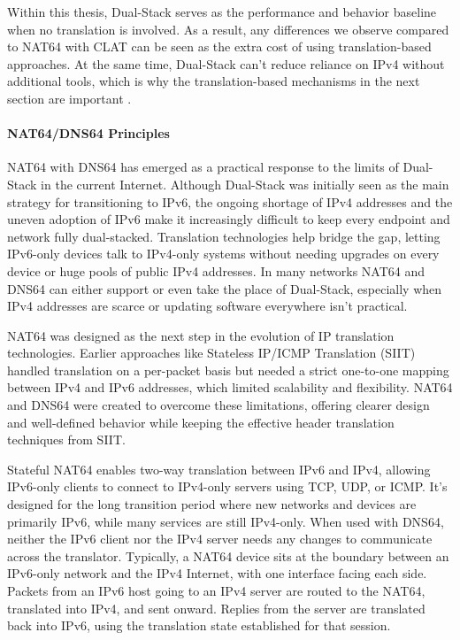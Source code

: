 Within this thesis, Dual-Stack serves as the performance and behavior baseline when no translation is involved. As a result, any differences we observe compared to NAT64 with CLAT can be seen as the extra cost of using translation-based approaches. At the same time, Dual-Stack can’t reduce reliance on IPv4 without additional tools, which is why the translation-based mechanisms in the next section are important \cite{punithavathani2009ipv4,LEVIN20141059}.

\paragraph{NAT64/DNS64 Principles} 


NAT64 with DNS64 has emerged as a practical response to the limits of Dual-Stack in the current Internet\cite{rfc7269}. Although Dual-Stack was initially seen as the main strategy for transitioning to IPv6, the ongoing shortage of IPv4 addresses and the uneven adoption of IPv6 make it increasingly difficult to keep every endpoint and network fully dual-stacked\cite{rfc7269}. Translation technologies help bridge the gap, letting IPv6-only devices talk to IPv4-only systems without needing upgrades on every device or huge pools of public IPv4 addresses. In many networks NAT64 and DNS64 can either support or even take the place of Dual-Stack, especially when IPv4 addresses are scarce or updating software everywhere isn’t practical\cite{6231295}.

NAT64 was designed as the next step in the evolution of IP translation technologies. Earlier approaches like Stateless IP/ICMP Translation (SIIT) handled translation on a per-packet basis but needed a strict one-to-one mapping between IPv4 and IPv6 addresses, which limited scalability and flexibility\cite{rfc6146}. NAT64 and DNS64 were created to overcome these limitations, offering clearer design and well-defined behavior while keeping the effective header translation techniques from SIIT\cite{6231295}.

Stateful NAT64 enables two-way translation between IPv6 and IPv4, allowing IPv6-only clients to connect to IPv4-only servers using TCP, UDP, or ICMP. It's designed for the long transition period where new networks and devices are primarily IPv6, while many services are still IPv4-only. When used with DNS64, neither the IPv6 client nor the IPv4 server needs any changes to communicate across the translator. Typically, a NAT64 device sits at the boundary between an IPv6-only network and the IPv4 Internet, with one interface facing each side. Packets from an IPv6 host going to an IPv4 server are routed to the NAT64, translated into IPv4, and sent onward. Replies from the server are translated back into IPv6, using the translation state established for that session\cite{rfc6146}.


